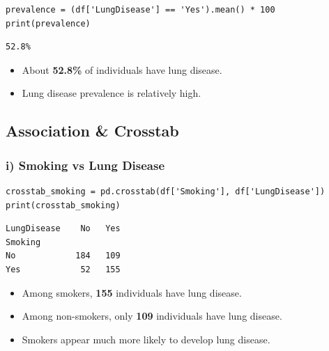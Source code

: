 \documentclass[12pt,a4paper]{article}
\begin{document}
\begin{lstlisting}
prevalence = (df['LungDisease'] == 'Yes').mean() * 100
print(prevalence)
\end{lstlisting}

\begin{outputbox}
\begin{verbatim}
52.8%
\end{verbatim}
\end{outputbox}

\begin{interpbox}
\begin{itemize}[noitemsep]
  \item About \textbf{52.8\%} of individuals have lung disease.
  \item Lung disease prevalence is relatively high.
\end{itemize}
\end{interpbox}

\subsection{Association \& Crosstab}

\subsubsection{i) Smoking vs Lung Disease}

\begin{lstlisting}
crosstab_smoking = pd.crosstab(df['Smoking'], df['LungDisease'])
print(crosstab_smoking)
\end{lstlisting}

\begin{outputbox}
\begin{verbatim}
LungDisease    No   Yes
Smoking
No            184   109
Yes            52   155
\end{verbatim}
\end{outputbox}

\begin{interpbox}
\begin{itemize}[noitemsep]
  \item Among smokers, \textbf{155} individuals have lung disease.
  \item Among non-smokers, only \textbf{109} individuals have lung disease.
  \item Smokers appear much more likely to develop lung disease.
\end{itemize}
\end{interpbox}
\end{document}
